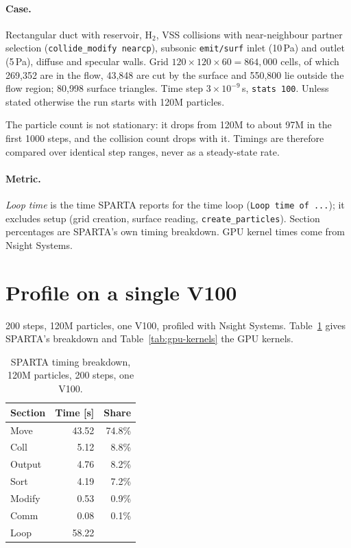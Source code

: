 \documentclass[11pt,a4paper]{article}
\newcommand{\code}[1]{\texttt{#1}}
\begin{document}
\paragraph{Case.} Rectangular duct with reservoir, H$_2$, VSS collisions with
near-neighbour partner selection (\code{collide\_modify nearcp}), subsonic
\code{emit/surf} inlet (10\,Pa) and outlet (5\,Pa), diffuse and specular walls.
Grid $120\times120\times60 = 864{,}000$ cells, of which 269,352 are in the flow,
43,848 are cut by the surface and 550,800 lie outside the flow region;
80,998 surface triangles. Time step $3\times10^{-9}$\,s, \code{stats 100}.
Unless stated otherwise the run starts with 120M particles.

The particle count is not stationary: it drops from 120M to about 97M in the
first 1000 steps, and the collision count drops with it. Timings are therefore
compared over identical step ranges, never as a steady-state rate.

\paragraph{Metric.} \emph{Loop time} is the time SPARTA reports for the time
loop (\code{Loop time of ...}); it excludes setup (grid creation, surface
reading, \code{create\_particles}). Section percentages are SPARTA's own timing
breakdown. GPU kernel times come from Nsight Systems.

\section{Profile on a single V100}

200 steps, 120M particles, one V100, profiled with Nsight Systems.
Table~\ref{tab:gpu-sections} gives SPARTA's breakdown and
Table~\ref{tab:gpu-kernels} the GPU kernels.

\begin{table}[h]
\centering
\begin{tabular}{lrr}
\toprule
Section & Time [s] & Share \\
\midrule
Move    & 43.52 & 74.8\% \\
Coll    &  5.12 &  8.8\% \\
Output  &  4.76 &  8.2\% \\
Sort    &  4.19 &  7.2\% \\
Modify  &  0.53 &  0.9\% \\
Comm    &  0.08 &  0.1\% \\
\midrule
Loop    & 58.22 & \\
\bottomrule
\end{tabular}
\caption{SPARTA timing breakdown, 120M particles, 200 steps, one V100.}
\label{tab:gpu-sections}
\end{table}
\end{document}
